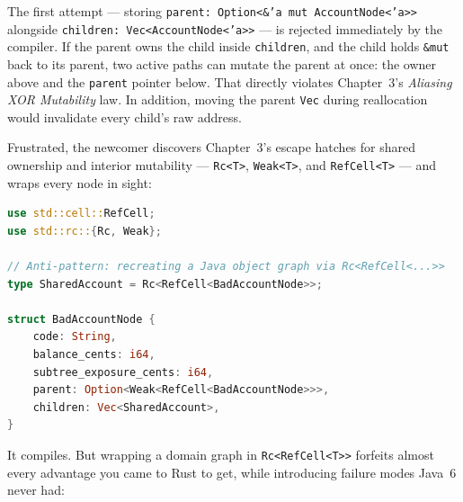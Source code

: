 The first attempt --- storing \texttt{parent:\allowbreak\ Option<\&'a mut AccountNode<'a>>} alongside \texttt{children:\allowbreak\ Vec<AccountNode<'a>>} --- is rejected immediately by the compiler. If the parent owns the child inside \texttt{children}, and the child holds \texttt{\&mut} back to its parent, two active paths can mutate the parent at once: the owner above and the \texttt{parent} pointer below. That directly violates Chapter~3's \emph{Aliasing XOR Mutability} law. In addition, moving the parent \texttt{Vec} during reallocation would invalidate every child's raw address.

Frustrated, the newcomer discovers Chapter~3's escape hatches for shared ownership and interior mutability --- \texttt{Rc<T>}, \texttt{Weak<T>}, and \texttt{RefCell<T>} --- and wraps every node in sight:

\begin{lstlisting}[language=Rust]
use std::cell::RefCell;
use std::rc::{Rc, Weak};

// Anti-pattern: recreating a Java object graph via Rc<RefCell<...>>
type SharedAccount = Rc<RefCell<BadAccountNode>>;

struct BadAccountNode {
    code: String,
    balance_cents: i64,
    subtree_exposure_cents: i64,
    parent: Option<Weak<RefCell<BadAccountNode>>>,
    children: Vec<SharedAccount>,
}
\end{lstlisting}

It compiles. But wrapping a domain graph in \texttt{Rc<RefCell<T>>} forfeits almost every advantage you came to Rust to get, while introducing failure modes Java~6 never had:

